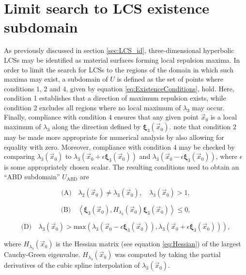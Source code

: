 \section{Limit search to LCS existence subdomain}\label{sec:AB_subdomain}

As previously discussed in section \ref{sec:LCS_id}, three-dimensional hyperbolic LCSs may be identified as material surfaces forming local repulsion maxima. In order to limit the search for LCSs to the regions of the domain in which such maxima may exist, a subdomain of $U$ is defined as the set of points where conditions $1$, $2$ and $4$, given by equation \eqref{eq:ExistenceConditions}, hold. Here, condition 1 establishes that a direction of maximum repulsion exists, while condition 2 excludes all regions where no local maximum of $\lambda_3$ may occur. Finally, compliance with condition $4$ ensures that any given point $\vec{x}_0$ is a local maximum of $\lambda_3$ along the direction defined by $\bm{\xi}_3(\vec{x}_0)$. \cite{Haller12} note that condition $2$ may be made more appropriate for numerical analysis by also allowing for equality with zero. Moreover, compliance with condition $4$ may be checked by comparing $\lambda_3(\vec{x}_0)$ to $\lambda_3(\vec{x}_0+\epsilon\bm{\xi}_3(\vec{x}_0))$ and $\lambda_3(\vec{x}_0-\epsilon\bm{\xi}_3(\vec{x}_0))$, where $\epsilon$ is some appropriately chosen scalar. The resulting conditions used to obtain an ``ABD subdomain'' $U_{\text{ABD}}$ are

\begin{equation}\label{eq:LCS_condition_A}
	\text{(A)} \quad \lambda_2(\vec{x}_0) \neq \lambda_3(\vec{x}_0),\quad \lambda_3(\vec{x}_0) > 1,
\end{equation} 

\begin{equation}\label{eq:LCS_condition_B}
	\text{(B)} \quad \left\langle \bm{\xi}_3(\vec{x}_0), H_{\lambda_3}(\vec{x}_0)\bm{\xi}_3(\vec{x}_0)\right\rangle \leq 0,
\end{equation}

\begin{equation}\label{eq:LCS_condition_D}
	\text{(D)} \quad \lambda_3(\vec{x}_0) > \text{max}(\lambda_3(\vec{x}_0 - \epsilon\bm{\xi}_3(\vec{x}_0)), \lambda_3(\vec{x}_0 + \epsilon\bm{\xi}_3(\vec{x}_0))),
\end{equation}


\noindent where $H_{\lambda_3}(\vec{x}_0)$ is the Hessian matrix (see equation \eqref{eq:Hessian}) of the largest Cauchy-Green eigenvalue. $H_{\lambda_3}(\vec{x}_0)$ was computed by taking the partial derivatives of the cubic spline interpolation of $\lambda_3(\vec{x}_0)$.

